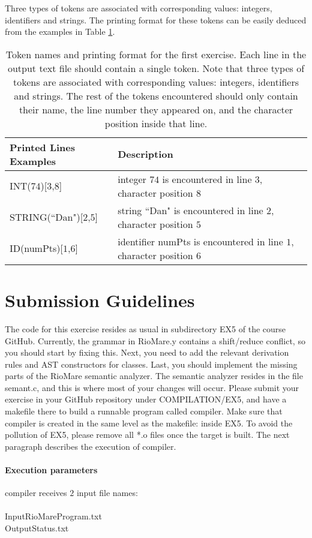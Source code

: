 \documentclass{article}
\begin{document}
Three types of tokens are associated with corresponding values: integers, identifiers and strings.
The printing format for these tokens can be easily deduced from the examples in Table \ref{Table_Token_Printing_Examples_For_Exercise_1}.
\begin{table}[h]
\centering
\begin{tabular}{|l|l| }
  Printed Lines Examples & Description \\
  \hline
  \hline
  INT($74$)[$3$,$8$] & integer $74$ is encountered in line $3$, character position $8$ \\
  \hline
  STRING(``Dan")[$2$,$5$] & string ``Dan" is encountered in line $2$, character position $5$ \\
  \hline
  ID(numPts)[$1$,$6$] & identifier numPts is encountered in line $1$, character position $6$ \\
  \hline
\end{tabular}
\caption{
Token names and printing format for the first exercise.
Each line in the output text file should contain a single token.
Note that three types of tokens are associated with corresponding values:
integers, identifiers and strings. The rest of the tokens encountered
should only contain their name,
the line number they appeared on, and the character position inside that line.
\label{Table_Token_Printing_Examples_For_Exercise_1}}
\end{table}

\section{Submission Guidelines}
The code for this exercise resides as usual in subdirectory EX5 of the course GitHub.
Currently, the grammar in RioMare.y contains a shift/reduce conflict,
so you should start by fixing this.
Next, you need to add the relevant derivation rules and AST constructors
for classes. Last, you should implement the missing parts of the RioMare semantic analyzer.
The semantic analyzer resides in the file semant.c, and this is where
most of your changes will occur.
Please submit your exercise in your GitHub repository under COMPILATION/EX5,
and have a makefile there to build a runnable program called compiler.
Make sure that compiler is created in the same level as the makefile: inside EX5.
To avoid the pollution of EX5, please remove all *.o files once the target is built.
The next paragraph describes the execution of compiler.

\paragraph{Execution parameters}
compiler receives $2$ input file names:\\ \\
InputRioMareProgram.txt\\
OutputStatus.txt
\end{document}
